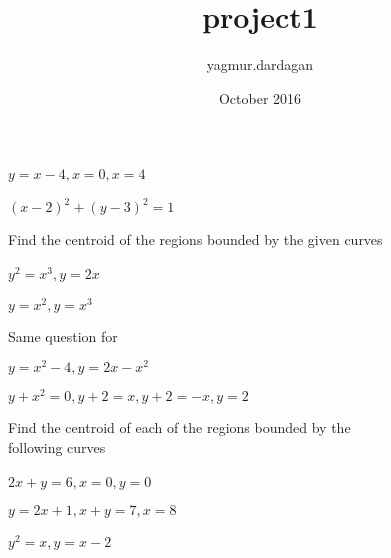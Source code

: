 \documentclass{amsbook}
\title{project1}
\author{yagmur.dardagan }
\date{October 2016}
\begin{document}

    \begin{hEnumerateAlpha}
        \begin{multicols}{2}    
                \item $y =x - 4 , x = 0 , x = 4$ $\quad \quad$
                \columnbreak
                \item $(x-2)^2 + (y-3)^2 = 1$
        \end{multicols}        
    \end{hEnumerateAlpha}
    
    \begin{hEnumerateArabic}
    \setcounter{enumi}{48}

        \item  {Find the centroid of the regions bounded by the given curves}
            \begin{hEnumerateAlpha}
                \begin{multicols}{2}  
                    \item $y^2 = x^3, y = 2x$ $\quad \quad$
                    \columnbreak
                    \item $y = x^2, y= x^3$
                \end{multicols}    
            \end{hEnumerateAlpha}
        \item {Same question for}
            \begin{hEnumerateAlpha}
            
                    \item $y = x^2 - 4, y = 2x - x^2$
                    
                    \item $y + x^2 = 0, y + 2= x, y + 2 = -x, y = 2$
                
            \end{hEnumerateAlpha} 
        \item
        Find the centroid of each of the regions bounded by the \\ following curves 
        
            \begin{hEnumerateAlpha}
                \begin{multicols}{2}
                    \item $2x + y = 6, x=0, y=0$ $\quad \quad$
                    
                    \item $y = 2x + 1, x + y = 7, x = 8$ \\ 
                    \columnbreak
                    \item $y^2 = x, y = x - 2$ $\quad \quad \quad \quad  \quad $
                    

\end{multicols}
\end{hEnumerateAlpha}
\end{hEnumerateArabic}
\end{document}
